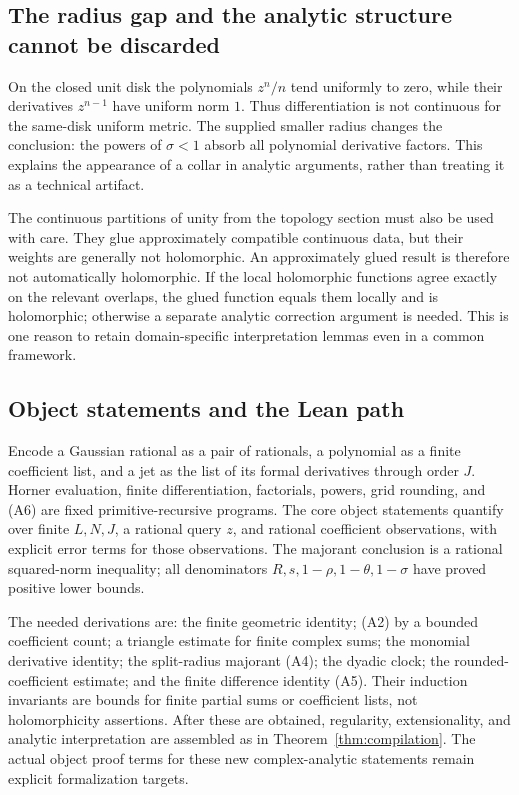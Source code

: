 \subsection{The radius gap and the analytic structure cannot be discarded}

On the closed unit disk the polynomials \(z^n/n\) tend uniformly to zero,
while their derivatives \(z^{n-1}\) have uniform norm \(1\).
Thus differentiation is not continuous for the same-disk uniform metric.
The supplied smaller radius changes the conclusion: the powers of
\(\sigma<1\) absorb all polynomial derivative factors. This explains the
appearance of a collar in analytic arguments, rather than treating it as
a technical artifact.

The continuous partitions of unity from the topology section must also be
used with care. They glue approximately compatible continuous data, but
their weights are generally not holomorphic. An approximately glued result
is therefore not automatically holomorphic. If the local holomorphic
functions agree exactly on the relevant overlaps, the glued function equals
them locally and is holomorphic; otherwise a separate analytic correction
argument is needed. This is one reason to retain domain-specific
interpretation lemmas even in a common framework.

\subsection{Object statements and the Lean path}

Encode a Gaussian rational as a pair of rationals, a polynomial as a finite
coefficient list, and a jet as the list of its formal derivatives through
order \(J\). Horner evaluation, finite differentiation, factorials, powers,
grid rounding, and (A6) are fixed primitive-recursive programs.
The core object statements quantify over finite \(L,N,J\), a rational query
\(z\), and rational coefficient observations, with explicit error terms for
those observations. The majorant conclusion is a rational squared-norm
inequality; all denominators \(R,s,1-\rho,1-\theta,1-\sigma\) have proved positive
lower bounds.

The needed derivations are: the finite geometric identity; (A2) by a bounded
coefficient count; a triangle estimate for finite complex sums; the monomial
derivative identity; the split-radius majorant (A4); the dyadic clock;
the rounded-coefficient estimate; and the finite difference identity (A5).
Their induction invariants are bounds for finite partial sums or coefficient
lists, not holomorphicity assertions. After these are obtained, regularity,
extensionality, and analytic interpretation are assembled as in
Theorem~\ref{thm:compilation}. The actual object proof terms for these new
complex-analytic statements remain explicit formalization targets.
